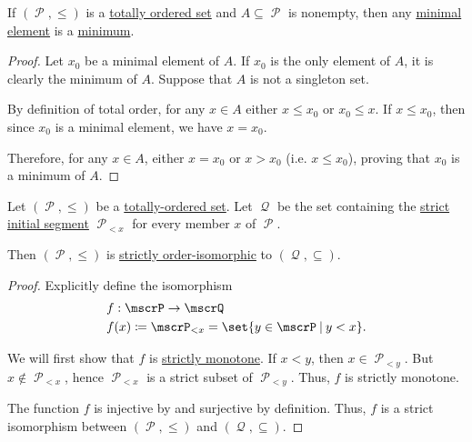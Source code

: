 \begin{proposition}\label{thm:totally_ordered_minimal_element_is_minimum}
  If \( (\mscrP, \leq) \) is a \hyperref[def:totally_ordered_set]{totally ordered set} and \( A \subseteq \mscrP \) is nonempty, then any \hyperref[def:partially_ordered_set_extremal_points/maximal_and_minimal_element]{minimal element} is a \hyperref[def:partially_ordered_set_extremal_points/maximum_and_minimum]{minimum}.
\end{proposition}
\begin{proof}
  Let \( x_0 \) be a minimal element of \( A \). If \( x_0 \) is the only element of \( A \), it is clearly the minimum of \( A \). Suppose that \( A \) is not a singleton set.

  By definition of total order, for any \( x \in A \) either \( x \leq x_0 \) or \( x_0 \leq x \). If \( x \leq x_0 \), then since \( x_0 \) is a minimal element, we have \( x = x_0 \).

  Therefore, for any \( x \in A \), either \( x = x_0 \) or \( x > x_0 \) (i.e. \( x \leq x_0 \)), proving that \( x_0 \) is a minimum of \( A \).
\end{proof}

\begin{proposition}\label{thm:totally_ordered_segment_isomorphism}
  Let \( (\mscrP, \leq) \) be a \hyperref[def:totally_ordered_set]{totally-ordered set}. Let \( \mscrQ \) be the set containing the \hyperref[def:partially_ordered_set_interval/ray]{strict initial segment} \( \mscrP_{<x} \) for every member \( x \) of \( \mscrP \).

  Then \( (\mscrP, \leq) \) is \hyperref[def:partially_ordered_set/homomorphism]{strictly order-isomorphic} to \( (\mscrQ, \subseteq) \).
\end{proposition}
\begin{proof}
  Explicitly define the isomorphism
  \begin{equation*}
    \begin{aligned}
      &f: \mscrP \to \mscrQ \\
      &f(x) \coloneqq \mscrP_{<x} = \set{ y \in \mscrP \given y < x }.
    \end{aligned}
  \end{equation*}

  We will first show that \( f \) is \hyperref[def:partially_ordered_set/homomorphism]{strictly monotone}. If \( x < y \), then \( x \in \mscrP_{<y} \). But \( x \not\in \mscrP_{<x} \), hence \( \mscrP_{<x} \) is a strict subset of \( \mscrP_{<y} \). Thus, \( f \) is strictly monotone.

  The function \( f \) is injective by  and surjective by definition. Thus, \( f \) is a strict isomorphism between \( (\mscrP, \leq) \) and \( (\mscrQ, \subseteq) \).
\end{proof}

